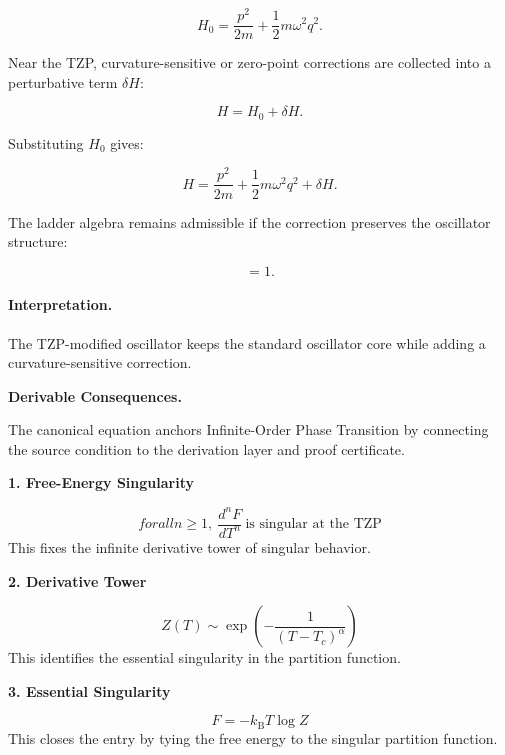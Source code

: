 \begin{equation}
H_0
=
\frac{p^2}{2m}
+
\frac{1}{2}m\omega^2 q^2 .
\end{equation}

Near the TZP, curvature-sensitive or zero-point corrections are collected into a perturbative term $\delta H$:

\begin{equation}
H = H_0+\delta H .
\end{equation}

Substituting $H_0$ gives:

\begin{equation}
\boxed{
H
=
\frac{p^2}{2m}
+
\frac{1}{2}m\omega^2 q^2
+
\delta H .
}
\end{equation}

The ladder algebra remains admissible if the correction preserves the oscillator structure:

\begin{equation}
[a,a^\dagger]=1 .
\end{equation}

\paragraph{Interpretation.}
The TZP-modified oscillator keeps the standard oscillator core while adding a curvature-sensitive correction.

\par\vspace{0.35em}
\noindent\textbf{Derivable Consequences.}\quad
\begingroup
\footnotesize
\raggedright
The canonical equation anchors Infinite-Order Phase Transition by connecting the source condition to the derivation layer and proof certificate.
\par\endgroup

\noindent\textbf{1. Free-Energy Singularity}\par
\[
forall n\geq 1,\ \frac{d^n F}{dT^n}\ \text{is singular at the TZP}
\]
\noindent This fixes the infinite derivative tower of singular behavior.\par
\noindent\textbf{2. Derivative Tower}\par
\[
Z(T)\sim \exp\!\left(-\frac{1}{(T-T_c)^\alpha}\right)
\]
\noindent This identifies the essential singularity in the partition function.\par
\noindent\textbf{3. Essential Singularity}\par
\[
F=-k_{\mathrm{B}}T\log Z
\]
\noindent This closes the entry by tying the free energy to the singular partition function.\par

